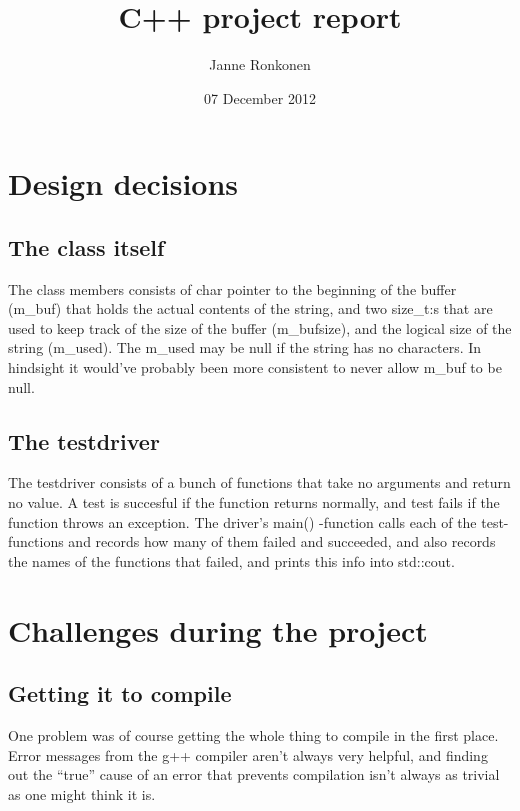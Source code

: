 \documentclass[11pt]{article}
\title{C++ project report}
\author{Janne Ronkonen}
\date{07 December 2012}
\begin{document}
\maketitle

\setcounter{tocdepth}{3}
\vspace*{1cm}


\section{Design decisions}
\label{sec-2}

\subsection{The class itself}
\label{sec-2.1}

The class members consists of char pointer to the beginning of the
buffer (m\_buf) that holds the actual contents of the string, and two
size\_t:s that are used to keep track of the size of the buffer
(m\_bufsize), and the logical size of the string (m\_used).  The m\_used
may be null if the string has no characters. In hindsight it would've
probably been more consistent to never allow m\_buf to be null.

\subsection{The testdriver}
\label{sec-2.2}

The testdriver consists of a bunch of functions that take no arguments
and return no value. A test is succesful if the function returns
normally, and test fails if the function throws an exception. The
driver's main() -function calls each of the test-functions and records
how many of them failed and succeeded, and also records the names of
the functions that failed, and prints this info into std::cout.


\section{Challenges during the project}
\subsection{Getting it to compile}

One problem was of course getting the whole thing to compile in the
first place. Error messages from the g++ compiler aren't always very helpful, and
finding out the ``true'' cause of an  error that prevents compilation
isn't always as trivial as one might think it is.
\end{document}
